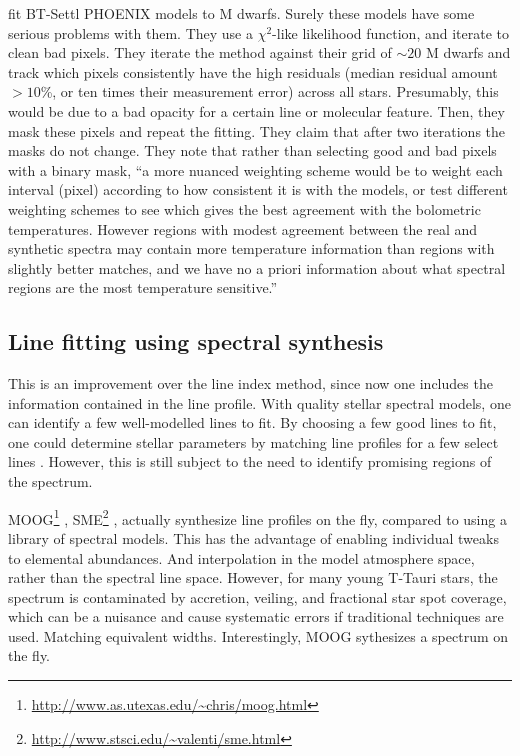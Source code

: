 \documentclass[preprint]{aastex} %
\begin{document}
\citet{mga13} fit BT-Settl PHOENIX models to M dwarfs. Surely these models have some serious problems with them. They use a $\chi^2$-like likelihood function, and iterate to clean bad pixels. They iterate the method against their grid of $\sim 20$ M dwarfs and track which pixels consistently have the high residuals (median residual amount $> 10$\%, or ten times their measurement error) across all stars. Presumably, this would be due to a bad opacity for a certain line or molecular feature. Then, they mask these pixels and repeat the fitting. They claim that after two iterations the masks do not change. They note that rather than selecting good and bad pixels with a binary mask, ``a more nuanced weighting scheme would be to weight each interval (pixel) according to how consistent it is with the models, or test different weighting schemes to see which gives the best agreement with the bolometric temperatures. However regions with modest agreement between the real and synthetic spectra may contain more temperature information than regions with slightly better matches, and we have no a priori information about what spectral regions are the most temperature sensitive.'' 


\subsection{Line fitting using spectral synthesis}
This is an improvement over the line index method, since now one includes the information contained in the line profile. With quality stellar spectral models, one can identify a few well-modelled lines to fit. By choosing a few good lines to fit, one could determine stellar parameters by matching line profiles for a few select lines \citep{dj03}. However, this is still subject to the need to identify promising regions of the spectrum.

MOOG\footnote{\url{http://www.as.utexas.edu/~chris/moog.html}} \citep{sne73}, SME\footnote{\url{http://www.stsci.edu/~valenti/sme.html}} \citep{vp96}, actually synthesize line profiles on the fly, compared to using a library of spectral models. This has the advantage of enabling individual tweaks to elemental abundances. And interpolation in the model atmosphere space, rather than the spectral line space. However, for many young T-Tauri stars, the spectrum is contaminated by accretion, veiling, and fractional star spot coverage, which can be a nuisance and cause systematic errors if traditional techniques are used. Matching equivalent widths. Interestingly, MOOG sythesizes a spectrum on the fly.
\end{document}

